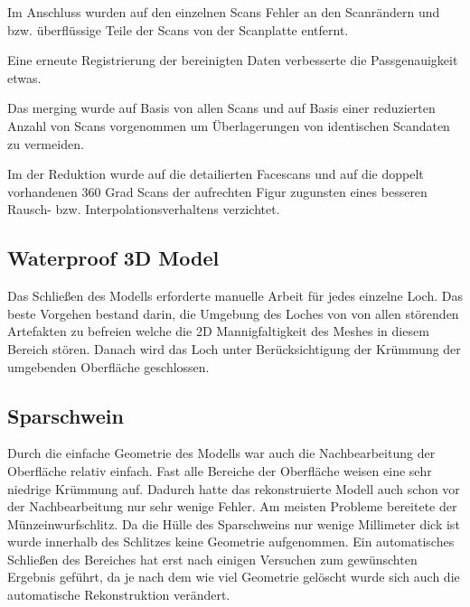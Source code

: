 \documentclass[]{article}
\begin{document}
Im Anschluss wurden auf den einzelnen Scans Fehler an den Scanrändern und bzw. überflüssige Teile der Scans von der Scanplatte entfernt.

Eine erneute Registrierung der bereinigten Daten verbesserte die Passgenauigkeit etwas. 

Das merging wurde auf Basis von allen Scans und auf Basis einer reduzierten Anzahl von Scans vorgenommen um Überlagerungen von identischen Scandaten zu vermeiden.

Im der Reduktion wurde auf die detailierten Facescans und auf die doppelt vorhandenen 360 Grad Scans der aufrechten Figur zugunsten eines besseren Rausch- bzw. Interpolationsverhaltens verzichtet.

\subsection{Waterproof 3D Model}

Das Schließen des Modells erforderte manuelle Arbeit für jedes einzelne Loch. Das beste Vorgehen bestand darin, die Umgebung des Loches von von allen störenden Artefakten zu befreien welche die 2D Mannigfaltigkeit des Meshes in diesem Bereich stören. Danach wird das Loch unter Berücksichtigung der Krümmung der umgebenden Oberfläche geschlossen.

\subsection{}
\subsection{}
\subsection{Sparschwein}
Durch die einfache Geometrie des Modells war auch die Nachbearbeitung der Oberfläche relativ einfach. Fast alle Bereiche der Oberfläche weisen eine sehr niedrige Krümmung auf. Dadurch hatte das rekonstruierte Modell auch schon vor der Nachbearbeitung nur sehr wenige Fehler. Am meisten Probleme bereitete der Münzeinwurfschlitz. Da die Hülle des Sparschweins nur wenige Millimeter dick ist wurde innerhalb des Schlitzes keine Geometrie aufgenommen. Ein automatisches Schließen des Bereiches hat erst nach einigen Versuchen zum gewünschten Ergebnis geführt, da je nach dem wie viel Geometrie gelöscht wurde sich auch die automatische Rekonstruktion verändert. 
\end{document}
